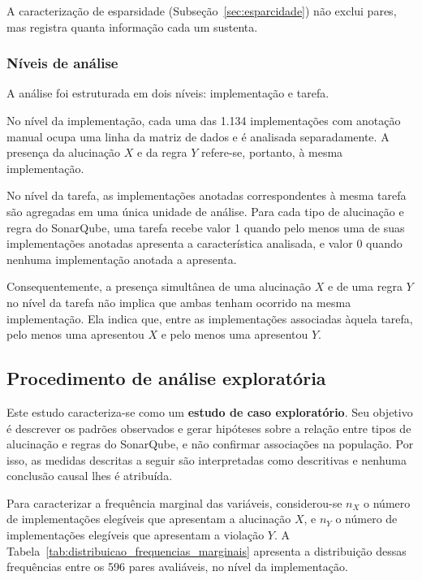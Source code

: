 A caracterização de esparsidade (Subseção~\ref{sec:esparcidade}) não exclui pares, mas registra quanta informação cada um sustenta.

\subsubsection{Níveis de análise}

A análise foi estruturada em dois níveis: implementação e tarefa.

No nível da implementação, cada uma das 1.134 implementações com anotação manual ocupa uma linha da matriz de dados e é analisada separadamente. A presença da alucinação $X$ e da regra $Y$ refere-se, portanto, à mesma implementação.

No nível da tarefa, as implementações anotadas correspondentes à mesma
tarefa são agregadas em uma única unidade de análise. Para cada tipo
de alucinação e regra do SonarQube, uma tarefa recebe valor 1 quando
pelo menos uma de suas implementações anotadas apresenta a característica
analisada, e valor 0 quando nenhuma implementação anotada a apresenta.

Consequentemente, a presença simultânea de uma alucinação $X$ e de uma
regra $Y$ no nível da tarefa não implica que ambas tenham ocorrido na
mesma implementação. Ela indica que, entre as implementações associadas
àquela tarefa, pelo menos uma apresentou $X$ e pelo menos uma apresentou
$Y$.

\subsection{Procedimento de análise exploratória}

Este estudo caracteriza-se como um \textbf{estudo de caso exploratório}. Seu objetivo é descrever os padrões observados e gerar hipóteses sobre a relação entre tipos de alucinação e regras do SonarQube, e não confirmar associações na população. Por isso, as medidas descritas a seguir são interpretadas como descritivas e nenhuma conclusão causal lhes é atribuída.

Para caracterizar a frequência marginal das variáveis, considerou-se
$n_X$ o número de implementações elegíveis que apresentam
a alucinação $X$, e $n_Y$ o número de
implementações elegíveis que apresentam a violação $Y$.
A Tabela~\ref{tab:distribuicao_frequencias_marginais} apresenta a
distribuição dessas frequências entre os 596 pares avaliáveis, no nível da implementação. 


